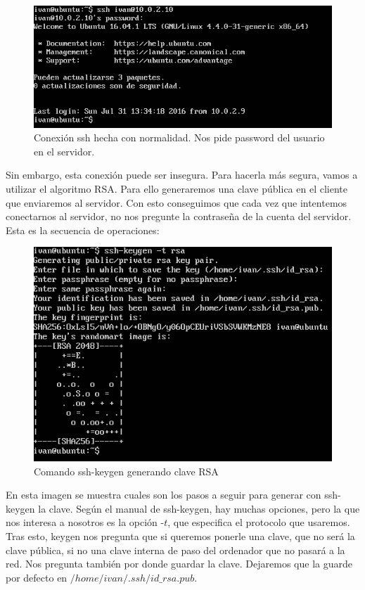  \begin{figure}[H]
	\centering
	\includegraphics[width=0.7\linewidth]{ssh_no_clave}
	\caption[Sesión ssh]{Conexión ssh hecha con normalidad. Nos pide password del usuario en el servidor.}
	\label{fig:ssh_no_clave}
\end{figure}

Sin embargo, esta conexión puede ser insegura. Para hacerla más segura, vamos a utilizar el algoritmo RSA. Para ello generaremos una clave pública en el cliente que enviaremos al servidor. Con esto conseguimos que cada vez que intentemos conectarnos al servidor, no nos pregunte la contraseña de la cuenta del servidor. Esta es la secuencia de operaciones:\\

\begin{figure}[H]
	\centering
	\includegraphics[width=0.7\linewidth]{keygen}
	\caption[Generando clave]{Comando ssh-keygen generando clave RSA}
	\label{fig:keygen}	
\end{figure}

En esta imagen se muestra cuales son los pasos a seguir para generar con ssh-keygen la clave. Según el manual de ssh-keygen\cite{ssh-keygen}, hay muchas opciones, pero la que nos interesa a nosotros es la opción -$t$, que especifica el protocolo que usaremos. Tras esto, keygen nos pregunta que si queremos ponerle una clave, que no será la clave pública, si no una clave interna de paso del ordenador que no pasará a la red. Nos pregunta también por donde guardar la clave. Dejaremos que la guarde por defecto en $/home/ivan/.ssh/id\_rsa.pub$. \\

